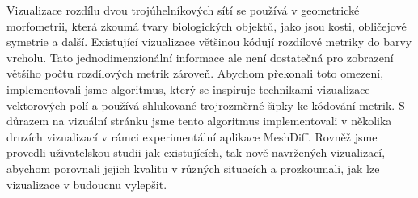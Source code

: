 \documentclass[12pt,a4paper,hyperfootnotes=false]{report}
\begin{document}
	
\noindent
Vizualizace rozdílu dvou trojúhelníkových sítí se používá v geometrické morfometrii, která zkoumá tvary biologických objektů, jako jsou kosti, obličejové symetrie a další. Existující vizualizace většinou kódují rozdílové metriky do barvy vrcholu. Tato jednodimenzionální informace ale není dostatečná pro zobrazení většího počtu rozdílových metrik zároveň. Abychom překonali toto omezení, implementovali jsme algoritmus, který se inspiruje technikami vizualizace vektorových polí a používá shlukované trojrozměrné šipky ke kódování metrik. S důrazem na vizuální stránku jsme tento algoritmus implementovali v několika druzích vizualizací v rámci experimentální aplikace MeshDiff. Rovněž jsme provedli uživatelskou studii jak existujících, tak nově navržených vizualizací, abychom porovnali jejich kvalitu v různých situacích a prozkoumali, jak lze vizualizace v budoucnu vylepšit.
\end{document}
